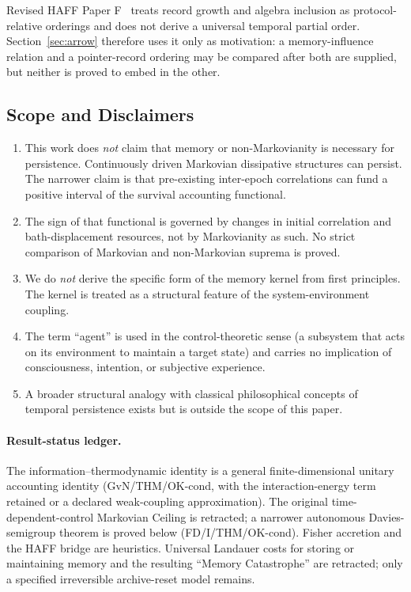 \documentclass[12pt]{article}
\begin{document}
Revised HAFF Paper F~\cite{Liu2026HAFF_F} treats record growth and
algebra inclusion as protocol-relative orderings and does not derive
a universal temporal partial order.  Section~\ref{sec:arrow} therefore
uses it only as motivation: a memory-influence relation and a
pointer-record ordering may be compared after both are supplied, but
neither is proved to embed in the other.

\subsection{Scope and Disclaimers}

\begin{enumerate}
\item This work does \emph{not} claim that memory or
  non-Markovianity is necessary for persistence.  Continuously driven
  Markovian dissipative structures can persist.  The narrower claim is
  that pre-existing inter-epoch correlations can fund a positive
  interval of the survival accounting functional.
\item The sign of that functional is governed by changes in initial
  correlation and bath-displacement resources, not by Markovianity as
  such.  No strict comparison of Markovian and non-Markovian suprema is
  proved.
\item We do \emph{not} derive the specific form of the memory
  kernel from first principles. The kernel is treated as a
  structural feature of the system-environment coupling.
\item The term ``agent'' is used in the control-theoretic sense
  (a subsystem that acts on its environment to maintain a target
  state) and carries no implication of consciousness, intention,
  or subjective experience.
\item A broader structural analogy with classical philosophical
  concepts of temporal persistence exists but is outside the
  scope of this paper.
\end{enumerate}

\paragraph{Result-status ledger.}
The information--thermodynamic identity is a general finite-dimensional
unitary accounting identity (GvN/THM/OK-cond, with the interaction-energy
term retained or a declared weak-coupling approximation).  The original
time-dependent-control Markovian Ceiling is retracted; a narrower
autonomous Davies-semigroup theorem is proved below (FD/I/THM/OK-cond).
Fisher accretion and the HAFF bridge are heuristics.  Universal
Landauer costs for storing or maintaining memory and the resulting
``Memory Catastrophe'' are retracted; only a specified irreversible
archive-reset model remains.
\end{document}
